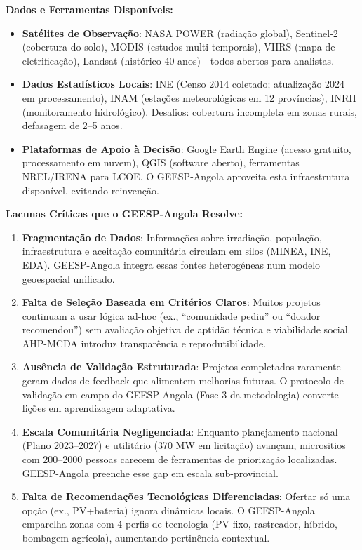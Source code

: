 \documentclass[12pt, a4paper]{article}
\begin{document}
\begin{itemize}
\textbf{Dados e Ferramentas Disponíveis:}
\begin{itemize}
\item \textbf{Satélites de Observação}: NASA POWER (radiação global), Sentinel-2 (cobertura do solo), MODIS (estudos multi-temporais), VIIRS (mapa de eletrificação), Landsat (histórico 40 anos)—todos abertos para analistas.
\item \textbf{Dados Estadísticos Locais}: INE (Censo 2014 coletado; atualização 2024 em processamento), INAM (estações meteorológicas em 12 províncias), INRH (monitoramento hidrológico). Desafios: cobertura incompleta em zonas rurais, defasagem de 2--5 anos.
\item \textbf{Plataformas de Apoio à Decisão}: Google Earth Engine (acesso gratuito, processamento em nuvem), QGIS (software aberto), ferramentas NREL/IRENA para LCOE. O GEESP-Angola aproveita esta infraestrutura disponível, evitando reinvenção.
\end{itemize}

\textbf{Lacunas Críticas que o GEESP-Angola Resolve:}
\begin{enumerate}
\item \textbf{Fragmentação de Dados}: Informações sobre irradiação, população, infraestrutura e aceitação comunitária circulam em silos (MINEA, INE, EDA). GEESP-Angola integra essas fontes heterogéneas num modelo geoespacial unificado.
\item \textbf{Falta de Seleção Baseada em Critérios Claros}: Muitos projetos continuam a usar lógica ad-hoc (ex., ``comunidade pediu'' ou ``doador recomendou'') sem avaliação objetiva de aptidão técnica e viabilidade social. AHP-MCDA introduz transparência e reprodutibilidade.
\item \textbf{Ausência de Validação Estruturada}: Projetos completados raramente geram dados de feedback que alimentem melhorias futuras. O protocolo de validação em campo do GEESP-Angola (Fase 3 da metodologia) converte lições em aprendizagem adaptativa.
\item \textbf{Escala Comunitária Negligenciada}: Enquanto planejamento nacional (Plano 2023–2027) e utilitário (370 MW em licitação) avançam, micrositios com 200--2000 pessoas carecem de ferramentas de priorização localizadas. GEESP-Angola preenche esse gap em escala sub-provincial.
\item \textbf{Falta de Recomendações Tecnológicas Diferenciadas}: Ofertar só uma opção (ex., PV+bateria) ignora dinâmicas locais. O GEESP-Angola emparelha zonas com 4 perfis de tecnologia (PV fixo, rastreador, híbrido, bombagem agrícola), aumentando pertinência contextual.
\end{enumerate}


\end{itemize}
\end{document}
